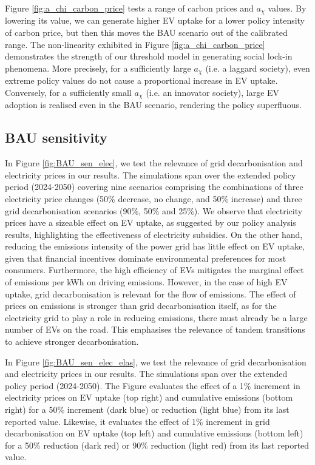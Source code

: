 \documentclass[12pt]{article}
\begin{document}
    Figure \ref{fig:a_chi_carbon_price} tests a range of carbon prices and $a_{\chi}$ values. By lowering its value, we can generate higher EV uptake for a lower policy intensity of carbon price, but then this moves the BAU scenario out of the calibrated range. The non-linearity exhibited in Figure \ref{fig:a_chi_carbon_price} demonstrates the strength of our threshold model in generating social lock-in phenomena. More precisely, for a sufficiently large $a_{\chi}$ (i.e. a laggard society), even extreme policy values do not cause a proportional increase in EV uptake. Conversely, for a sufficiently small $a_{\chi}$ (i.e. an innovator society), large EV adoption is realised even in the BAU scenario, rendering the policy superfluous.

    \subsection{BAU sensitivity}
    \label{bau_sensitivity}

    In Figure \ref{fig:BAU_sen_elec}, we test the relevance of grid decarbonisation and electricity prices in our results. The simulations span over the extended policy period (2024-2050) covering nine scenarios comprising the combinations of three electricity price changes (50\% decrease, no change, and 50\% increase) and three grid decarbonisation scenarios (90\%, 50\% and 25\%). We observe that electricity prices have a sizeable effect on EV uptake, as suggested by our policy analysis results, highlighting the effectiveness of electricity subsidies. On the other hand, reducing the emissions intensity of the power grid has little effect on EV uptake, given that financial incentives dominate environmental preferences for most consumers. Furthermore, the high efficiency of EVs mitigates the marginal effect of emissions per kWh on driving emissions. However, in the case of high EV uptake, grid decarbonisation is relevant for the flow of emissions. The effect of prices on emissions is stronger than grid decarbonisation itself, as for the electricity grid to play a role in reducing emissions, there must already be a large number of EVs on the road. This emphasises the relevance of tandem transitions to achieve stronger decarbonisation.

    In Figure \ref{fig:BAU_sen_elec_elas}, we test the relevance of grid decarbonisation and electricity prices in our results. The simulations span over the extended policy period (2024-2050). The Figure evaluates the effect of a 1\% increment in electricity prices on EV uptake (top right) and cumulative emissions (bottom right) for a 50\% increment (dark blue) or reduction (light blue) from its last reported value. Likewise, it evaluates the effect of 1\% increment in grid decarbonisation on EV uptake (top left) and cumulative emissions (bottom left) for a 50\% reduction (dark red) or 90\% reduction (light red) from its last reported value.
    
\end{document}
